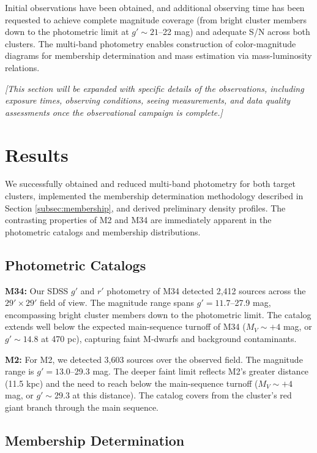 \documentclass[linenumbers,trackchanges,twocolumn]{aastex701}
\begin{document}
Initial observations have been obtained, and additional observing time has been requested to achieve complete magnitude coverage (from bright cluster members down to the photometric limit at $g' \sim 21$--22 mag) and adequate S/N across both clusters. The multi-band photometry enables construction of color-magnitude diagrams for membership determination and mass estimation via mass-luminosity relations.

\textit{[This section will be expanded with specific details of the observations, including exposure times, observing conditions, seeing measurements, and data quality assessments once the observational campaign is complete.]}

\section{Results} \label{sec:results}

We successfully obtained and reduced multi-band photometry for both target clusters, implemented the membership determination methodology described in Section \ref{subsec:membership}, and derived preliminary density profiles. The contrasting properties of M2 and M34 are immediately apparent in the photometric catalogs and membership distributions.

\subsection{Photometric Catalogs}

\textbf{M34:} Our SDSS $g'$ and $r'$ photometry of M34 detected 2,412 sources across the $29' \times 29'$ field of view. The magnitude range spans $g' = 11.7$--27.9 mag, encompassing bright cluster members down to the photometric limit. The catalog extends well below the expected main-sequence turnoff of M34 ($M_V \sim +4$ mag, or $g' \sim 14.8$ at 470 pc), capturing faint M-dwarfs and background contaminants.

\textbf{M2:} For M2, we detected 3,603 sources over the observed field. The magnitude range is $g' = 13.0$--29.3 mag. The deeper faint limit reflects M2's greater distance (11.5 kpc) and the need to reach below the main-sequence turnoff ($M_V \sim +4$ mag, or $g' \sim 29.3$ at this distance). The catalog covers from the cluster's red giant branch through the main sequence.

\subsection{Membership Determination}
\end{document}
